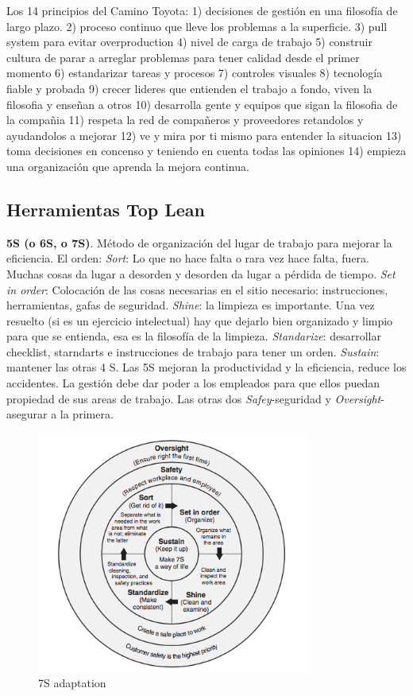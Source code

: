 \documentclass[]{article}
\begin{document}
Los 14 principios del Camino Toyota: 1) decisiones de gestión en una filosofía de largo plazo. 2) proceso continuo que lleve los problemas a la superficie. 3) pull system para evitar overproduction 4) nivel de carga de trabajo 5) construir cultura de parar a arreglar problemas para tener calidad desde el primer momento 6) estandarizar tareas y procesos 7) controles visuales 8) tecnología fiable y probada 9) crecer lideres que entienden el trabajo a fondo, viven la filosofia y enseñan a otros 10) desarrolla gente y equipos que sigan la filosofia de la compañia 11) respeta la red de compañeros y proveedores retandolos y ayudandolos a mejorar 12) ve y mira por ti mismo para entender la situacion 13) toma decisiones en concenso y teniendo en cuenta todas las opiniones 14) empieza una organización que aprenda la mejora continua.

\subsection{Herramientas Top Lean}

\textbf{5S (o 6S, o 7S)}. Método de organización del lugar de trabajo para mejorar la eficiencia. El orden: \textit{Sort}: Lo que no hace falta o rara vez hace falta, fuera. Muchas cosas da lugar a desorden y desorden da lugar a pérdida de tiempo. \textit{Set in order}: Colocación de las cosas necesarias en el sitio necesario: instrucciones, herramientas, gafas de seguridad. \textit{Shine}: la limpieza es importante. Una vez resuelto (si es un ejercicio intelectual) hay que dejarlo bien organizado y limpio para que se entienda, esa es la filosofía de la limpieza. \textit{Standarize}: desarrollar checklist, starndarts e instrucciones de trabajo para tener un orden. \textit{Sustain}: mantener las otras 4 S. Las 5S mejoran la productividad y la eficiencia, reduce los accidentes. La gestión debe dar poder a los empleados para que ellos puedan propiedad de sus areas de trabajo. Las otras dos \textit{Safey}-seguridad y \textit{Oversight}-asegurar a la primera.

\begin{figure}[ht!]
	\centering
	\includegraphics[width=90mm]{imagenes/7S.png}
	\caption{7S adaptation}
	\label{fig:Las7S}
\end{figure}
\end{document}
